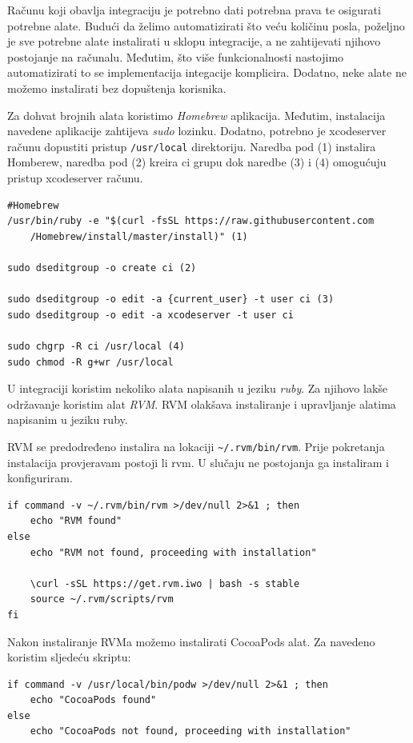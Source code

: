 \documentclass[times, utf8, diplomski, numeric]{fer}
\begin{document}
\begin{appendices}
Računu koji obavlja integraciju je potrebno dati potrebna prava te osigurati potrebne alate. Budući da želimo automatizirati što veću količinu posla, poželjno je sve potrebne alate instalirati u sklopu integracije, a ne zahtijevati njihovo postojanje na računalu. Međutim, što više funkcionalnosti nastojimo automatizirati to se implementacija integacije komplicira. Dodatno, neke alate ne možemo instalirati bez dopuštenja korisnika.

Za dohvat brojnih alata koristimo \textit{Homebrew} aplikacija. Međutim, instalacija navedene aplikacije zahtijeva \textit{sudo} lozinku. Dodatno, potrebno je xcodeserver računu dopustiti pristup \verb|/usr/local| direktoriju. Naredba pod (1) instalira Homberew, naredba pod (2) kreira ci grupu dok naredbe (3) i (4) omogućuju pristup xcodeserver računu.

\begin{verbatim}
#Homebrew
/usr/bin/ruby -e "$(curl -fsSL https://raw.githubusercontent.com
    /Homebrew/install/master/install)" (1)

sudo dseditgroup -o create ci (2)

sudo dseditgroup -o edit -a {current_user} -t user ci (3)
sudo dseditgroup -o edit -a xcodeserver -t user ci

sudo chgrp -R ci /usr/local (4)
sudo chmod -R g+wr /usr/local

\end{verbatim}

U integraciji koristim nekoliko alata napisanih u jeziku \textit{ruby}. Za njihovo lakše održavanje koristim alat \textit{RVM}. RVM olakšava instaliranje i upravljanje alatima napisanim u jeziku ruby.

RVM se predodređeno instalira na lokaciji \verb|~/.rvm/bin/rvm|. Prije pokretanja instalacija provjeravam postoji li rvm. U slučaju ne postojanja ga instaliram i konfiguriram.

\begin{verbatim}
if command -v ~/.rvm/bin/rvm >/dev/null 2>&1 ; then
    echo "RVM found"
else
    echo "RVM not found, proceeding with installation"

    \curl -sSL https://get.rvm.iwo | bash -s stable
    source ~/.rvm/scripts/rvm
fi
\end{verbatim}

Nakon instaliranje RVMa možemo instalirati CocoaPods alat. Za navedeno koristim sljedeću skriptu:

\begin{verbatim}
if command -v /usr/local/bin/podw >/dev/null 2>&1 ; then
    echo "CocoaPods found"
else
    echo "CocoaPods not found, proceeding with installation"


\end{verbatim}
\end{appendices}
\end{document}
